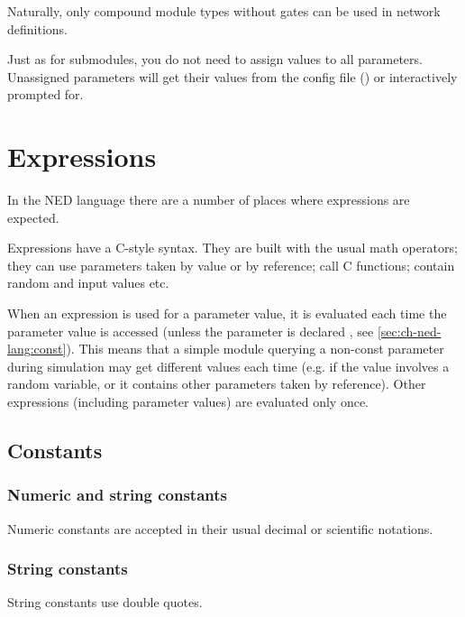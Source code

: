 Naturally, only compound module types without gates can
be used in network definitions.

Just as for submodules, you do not need to assign values to all
parameters. Unassigned parameters will get their values from the
config file () or interactively prompted for.



\section{Expressions}
\label{ch-ned-lang:sec:expressions}

In the NED language there are a number of places where
expressions are expected.

Expressions have a C-style syntax. They are built with the usual math
operators; they can use parameters taken by
value or by reference; call C functions; contain random and input
values etc.

When an expression is used for a parameter value, it is evaluated
each time the parameter value is accessed (unless the parameter is
declared , see \ref{sec:ch-ned-lang:const}). This means
that a simple module querying a non-const parameter during simulation
may get different values each time (e.g. if the value involves a
random variable, or it contains other parameters taken by reference).
Other expressions (including  parameter values)
are evaluated only once.


\subsection{Constants}

\subsubsection{Numeric and string constants}

Numeric constants are accepted in their usual decimal or
scientific notations.


\subsubsection{String constants}

String constants use double quotes.

